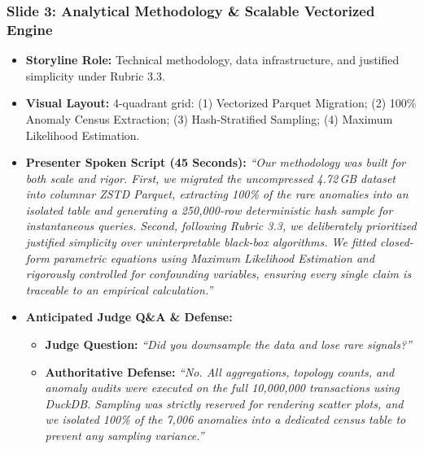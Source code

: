 \documentclass[11pt,a4paper]{article}
\begin{document}
\subsubsection{Slide 3: Analytical Methodology \& Scalable Vectorized Engine}
\begin{itemize}
    \item \textbf{Storyline Role:} Technical methodology, data infrastructure, and justified simplicity under Rubric 3.3.
    \item \textbf{Visual Layout:} 4-quadrant grid: (1) Vectorized Parquet Migration; (2) 100\% Anomaly Census Extraction; (3) Hash-Stratified Sampling; (4) Maximum Likelihood Estimation.
    \item \textbf{Presenter Spoken Script (45 Seconds):}
    \textit{``Our methodology was built for both scale and rigor. First, we migrated the uncompressed 4.72\,GB dataset into columnar ZSTD Parquet, extracting 100\% of the rare anomalies into an isolated table and generating a 250,000-row deterministic hash sample for instantaneous queries. Second, following Rubric 3.3, we deliberately prioritized justified simplicity over uninterpretable black-box algorithms. We fitted closed-form parametric equations using Maximum Likelihood Estimation and rigorously controlled for confounding variables, ensuring every single claim is traceable to an empirical calculation.''}
    \item \textbf{Anticipated Judge Q\&A \& Defense:}
    \begin{itemize}
        \item \textbf{Judge Question:} \textit{``Did you downsample the data and lose rare signals?''}
        \item \textbf{Authoritative Defense:} \textit{``No. All aggregations, topology counts, and anomaly audits were executed on the full 10,000,000 transactions using DuckDB. Sampling was strictly reserved for rendering scatter plots, and we isolated 100\% of the 7,006 anomalies into a dedicated census table to prevent any sampling variance.''}
    \end{itemize}
\end{itemize}
\end{document}
